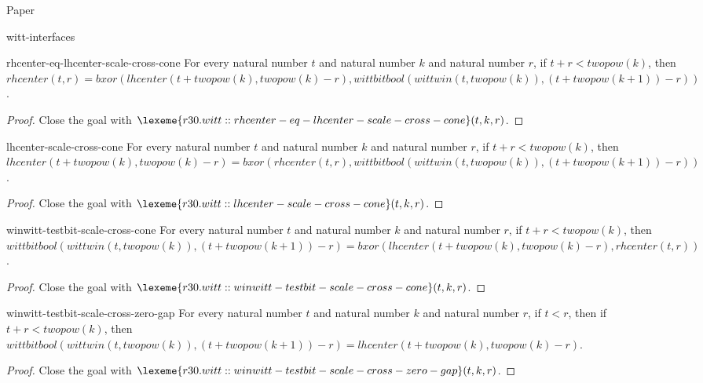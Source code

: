 \begin{lexlean}{Paper}
\begin{section}{witt-interfaces}
  \begin{theorem}{rhcenter-eq-lhcenter-scale-cross-cone}
  For every natural number \(t\) and natural number \(k\) and natural number \(r\), if \(t + r < twopow(k)\), then \(rhcenter(t, r) = bxor(lhcenter(t + twopow(k), twopow(k) - r), wittbitbool(wittwin(t, twopow(k)), (t + twopow(k + 1)) - r))\).
  \begin{proof}
  Close the goal with \(\lexeme{r30.witt::rhcenter-eq-lhcenter-scale-cross-cone}(t, k, r)\).
  \end{proof}
  \end{theorem}

  \begin{theorem}{lhcenter-scale-cross-cone}
  For every natural number \(t\) and natural number \(k\) and natural number \(r\), if \(t + r < twopow(k)\), then \(lhcenter(t + twopow(k), twopow(k) - r) = bxor(rhcenter(t, r), wittbitbool(wittwin(t, twopow(k)), (t + twopow(k + 1)) - r))\).
  \begin{proof}
  Close the goal with \(\lexeme{r30.witt::lhcenter-scale-cross-cone}(t, k, r)\).
  \end{proof}
  \end{theorem}

  \begin{theorem}{winwitt-testbit-scale-cross-cone}
  For every natural number \(t\) and natural number \(k\) and natural number \(r\), if \(t + r < twopow(k)\), then \(wittbitbool(wittwin(t, twopow(k)), (t + twopow(k + 1)) - r) = bxor(lhcenter(t + twopow(k), twopow(k) - r), rhcenter(t, r))\).
  \begin{proof}
  Close the goal with \(\lexeme{r30.witt::winwitt-testbit-scale-cross-cone}(t, k, r)\).
  \end{proof}
  \end{theorem}

  \begin{theorem}{winwitt-testbit-scale-cross-zero-gap}
  For every natural number \(t\) and natural number \(k\) and natural number \(r\), if \(t < r\), then if \(t + r < twopow(k)\), then \(wittbitbool(wittwin(t, twopow(k)), (t + twopow(k + 1)) - r) = lhcenter(t + twopow(k), twopow(k) - r)\).
  \begin{proof}
  Close the goal with \(\lexeme{r30.witt::winwitt-testbit-scale-cross-zero-gap}(t, k, r)\).
  \end{proof}
  \end{theorem}


\end{section}
\end{lexlean}
